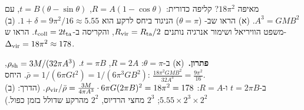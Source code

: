 \begin{exercise}{מאיפה $18\pi^2$?}
קליפה כדורית: $R=A(1-\cos\theta)$, $t=B(\theta-\sin\theta)$, עם $A^3=GMB^2$. (א) הראו שב- ($\theta=\pi$) הניגוד ביחס לרקע  הוא $1+\delta=9\pi^2/16\approx5.55$. (ב) משפט הוויריאל ושימור אנרגיה נותנים $R_{\rm vir}=R_{\rm ta}/2$, והקריסה ב-$t_{\rm coll}=2t_{\rm ta}$. הראו ש-$\Delta_{\rm vir}=18\pi^2\approx178$.
\end{exercise}
\begin{solbox}
\textbf{פתרון.}\ (א) ב-$\theta=\pi$: $R=2A$, $t=\pi B$. $\rho_{\rm sh}=3M/(32\pi A^3)$, $\bar\rho=1/(6\pi Gt^2)=1/(6\pi^3GB^2)$. היחס: $\frac{18\pi^2GMB^2}{32A^3}=\frac{9\pi^2}{16}$.\\
(ב) ב-$t=2\pi B$ ו-$R=A$: $\rho_{\rm vir}/\bar\rho=\frac{3M}{4\pi A^3}\cdot6\pi G(2\pi B)^2=18\pi^2=178$. (הדרך: $5.55\times2^3\times2^2$; $2^3$ מחצי הרדיוס, $2^2$ מהרקע שדולל בזמן כפול.)
\end{solbox}

